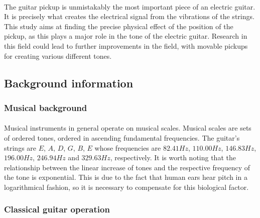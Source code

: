 \documentclass{article}
\begin{document}
\paragraph*{}
The guitar pickup is unmistakably the most important piece of an electric 
guitar. It is precisely what creates the electrical signal from the vibrations 
of the strings. This study aims at finding the precise physical effect of 
the position of the pickup, as this plays a major role in the tone of the 
electric guitar. Research in this field could lead to further improvements in 
the field, with movable pickups for creating various different tones.

\subsection{Background information}

\subsubsection{Musical background}

\paragraph*{}
Musical instruments in general operate on musical scales. Musical scales are 
sets of ordered tones, ordered in ascending fundamental frequencies. The 
guitar's strings are $E$, $A$, $D$, $G$, $B$, $E$ whose frequencies are 
$82.41\si{Hz}$, $110.00\si{Hz}$, $146.83\si{Hz}$, $196.00\si{Hz}$, 
$246.94\si{Hz}$ and $329.63\si{Hz}$, respectively. It is worth noting that the 
relationship between the linear increase of tones and the respective frequency 
of the tone is exponential. This is due to the fact that human ears hear pitch 
in a logarithmical fashion, so it is necessary to compensate for this 
biological factor.

\subsubsection{Classical guitar operation}
\end{document}
